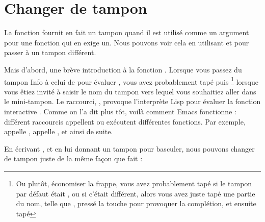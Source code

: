 \section{Changer de tampon}

La fonction  fournit en fait un tampon quand il est
utilisé comme un argument pour une fonction qui en exige un. Nous
pouvons voir cela en utilisant  et
 pour passer à un tampon différent.

Mais d'abord, une brève introduction à la fonction
. Lorsque vous passez du tampon Info à celui de
 pour évaluer , vous avez probablement
tapé  puis \footnote{Ou plutôt, économiser la
  frappe, vous avez probablement tapé \RET si le tampon par défaut
  était , ou si c'était différent, alors vous avez juste
tapé une partie du nom, telle que , pressé la touche \TAB pour
provoquer la complétion, et ensuite tapé \RET} lorsque vous êtiez
invité à saisir le nom du tampon vers lequel vous souhaitiez aller
dans le mini-tampon. Le raccourci, , provoque l'interprète
Lisp pour évaluer la fonction interactive . Comme
on l'a dit plus tôt, voilà comment Emacs fonctionne : différent
raccourcis appellent ou exécutent différentes fonctions. Par exemple,
 appelle ,  appelle
, et ainsi de suite.

En écrivant , et en lui donnant un tampon pour
basculer, nous pouvons changer de tampon juste de la même façon que
fait  : 


